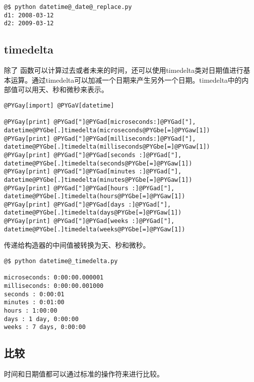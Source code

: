 \documentclass[a4paper,10pt,english]{manual}
\begin{document}
\begin{Verbatim}[commandchars=@\[\]]
@$ python datetime@_date@_replace.py
d1: 2008-03-12
d2: 2009-03-12
\end{Verbatim}


\subsection{timedelta}

除了  函数可以计算过去或者未来的时间，还可以使用timedelta类对日期值进行基本运算。通过timedelta可以加减一个日期来产生另外一个日期。timedelta中的内部值可以用天、秒和微秒来表示。

\begin{Verbatim}[commandchars=@\[\]]
@PYGay[import] @PYGaV[datetime]

@PYGay[print] @PYGad["]@PYGad[microseconds:]@PYGad["], datetime@PYGbe[.]timedelta(microseconds@PYGbe[=]@PYGaw[1])
@PYGay[print] @PYGad["]@PYGad[milliseconds:]@PYGad["], datetime@PYGbe[.]timedelta(milliseconds@PYGbe[=]@PYGaw[1])
@PYGay[print] @PYGad["]@PYGad[seconds :]@PYGad["], datetime@PYGbe[.]timedelta(seconds@PYGbe[=]@PYGaw[1])
@PYGay[print] @PYGad["]@PYGad[minutes :]@PYGad["], datetime@PYGbe[.]timedelta(minutes@PYGbe[=]@PYGaw[1])
@PYGay[print] @PYGad["]@PYGad[hours :]@PYGad["], datetime@PYGbe[.]timedelta(hours@PYGbe[=]@PYGaw[1])
@PYGay[print] @PYGad["]@PYGad[days :]@PYGad["], datetime@PYGbe[.]timedelta(days@PYGbe[=]@PYGaw[1])
@PYGay[print] @PYGad["]@PYGad[weeks :]@PYGad["], datetime@PYGbe[.]timedelta(weeks@PYGbe[=]@PYGaw[1])
\end{Verbatim}

传递给构造器的中间值被转换为天、秒和微秒。

\begin{Verbatim}[commandchars=@\[\]]
@$ python datetime@_timedelta.py

microseconds: 0:00:00.000001
milliseconds: 0:00:00.001000
seconds : 0:00:01
minutes : 0:01:00
hours : 1:00:00
days : 1 day, 0:00:00
weeks : 7 days, 0:00:00
\end{Verbatim}


\subsection{比较}

时间和日期值都可以通过标准的操作符来进行比较。
\end{document}
